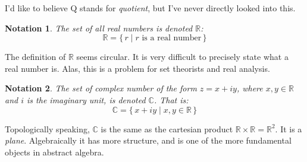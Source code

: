 \documentclass{article}
\theoremstyle{plain}
\theoremstyle{normal}
\newtheorem{notation}{Notation}[section]
\begin{document}
        I'd like to believe Q stands for \textit{quotient}, but I've never
        directly looked into this.
        \begin{notation}
            \label{not:reals}%
            The set of all real numbers is denoted $\mathbb{R}$:
            \begin{equation}
                \mathbb{R}=\{\,r\;|\;r\textrm{ is a real number}\,\}
            \end{equation}
        \end{notation}
        The definition of $\mathbb{R}$ seems circular. It is very
        difficult to precisely state what a real number is. Alas, this is a
        problem for set theorists and real analysis.
        \begin{notation}
            The set of \textit{complex number} of the form $z=x+iy$, where
            $x,y\in\mathbb{R}$ and $i$ is the \textit{imaginary unit}, is
            denoted $\mathbb{C}$. That is:
            \begin{equation}
                \mathbb{C}=\{\,x+iy\;|\;x,y\in\mathbb{R}\,\}
            \end{equation}
        \end{notation}
        Topologically speaking, $\mathbb{C}$ is the same as the cartesian
        product $\mathbb{R}\times\mathbb{R}=\mathbb{R}^{2}$. It is a
        \textit{plane}. Algebraically it has more structure, and is one of the
        more fundamental objects in abstract algebra.
\end{document}
